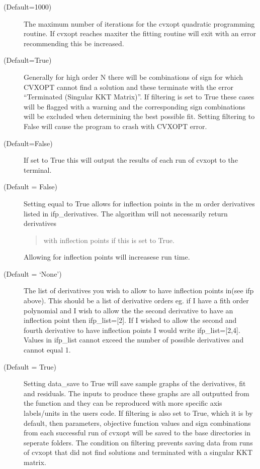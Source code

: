 \documentclass[letterpaper,10pt,english]{sphinxmanual}
\begin{document}
\begin{fulllineitems}
\begin{description}
\item[{ (Default=1000)}] \leavevmode
The maximum number of iterations for the cvxopt quadratic
programming routine. If cvxopt reaches maxiter the fitting routine
will exit with an error recommending this be increased.

\item[{ (Default=True)}] \leavevmode
Generally for high order N there will be
combinations of sign for which CVXOPT cannot find a solution and
these terminate with the error “Terminated (Singular KKT Matrix)”.
If filtering is set to True these cases will be flagged with a warning
and the corresponding sign combinations will be excluded when
determining the best possible fit. Setting filtering to False will
cause the program to crash with CVXOPT error.

\item[{ (Default=False)}] \leavevmode
If set to True this will output the results of each run of cvxopt
to the terminal.

\item[{ (Default = False)}] \leavevmode
Setting equal to True allows for inflection points in the m order
derivatives listed in ifp\_derivatives.
 The algorithm will not necessarily return derivatives
\begin{quote}

with inflection points if this is set to True.
\end{quote}

 Allowing for inflection points will increasese run time.

\item[{ (Default = ‘None’)}] \leavevmode
The list of derivatives you wish to allow
to have inflection points in(see ifp above). This should be a list
of derivative orders eg. if I have a fith order
polynomial and I wish to allow the the second derivative to have
an inflection point then ifp\_list={[}2{]}. If I wished to allow the
second and fourth derivative to have inflection points
I would write ifp\_list={[}2,4{]}. Values in ifp\_list cannot exceed the
number of possible derivatives and cannot equal 1.

\item[{ (Default = True)}] \leavevmode
Setting data\_save to True will save sample
graphs of the derivatives, fit and residuals. The inputs to
produce these graphs are all outputted from the  function
and they can be reproduced with more specific axis labels/units in
the users code. If filtering is also set to True, which it is by
default, then parameters, objective function values and sign
combinations from each successful run of cvxopt will be saved
to the base directories in seperate folders. The condition on
filtering prevents saving data from runs of cvxopt that did not
find solutions and terminated with a singular KKT matrix.


\end{description}
\end{fulllineitems}
\end{document}
